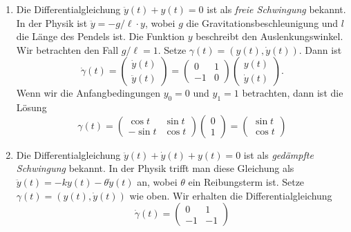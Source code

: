 \documentclass[../main.tex]{subfiles}
\begin{document}
\begin{examples}
  \leavevmode
  \begin{enumerate}[(1)]
    \item Die Differentialgleichung $\ddot y(t) + y(t) = 0$ 
      ist als
      \emph{freie Schwingung}
      bekannt. In der Physik ist $\ddot y = -g/\ell \cdot y$,
      wobei $g$ die Gravitationsbeschleunigung und $l$ 
      die Länge des Pendels ist.
      Die Funktion $y$ beschreibt den Auslenkungswinkel.
      Wir betrachten den Fall $g/\ell = 1$.
      Setze $\gamma(t) = (y(t), \dot y(t))$.
      Dann ist
      \[
        \dot \gamma(t) =
        \begin{pmatrix}
          \dot y(t) \\
          \ddot y(t)
        \end{pmatrix}
        =
        \begin{pmatrix}
          0 & 1 \\ -1 & 0
        \end{pmatrix}
        \begin{pmatrix}
          y(t) \\
          \dot y(t)
        \end{pmatrix}.
      \]
      Wenn wir die Anfangbedingungen $y_0 = 0$ 
      und $y_1 = 1$ betrachten, dann ist die Lösung
      \[
        \gamma(t) =
        \begin{pmatrix}
          \cos t & \sin t \\
          -\sin t & \cos t
        \end{pmatrix}
        \begin{pmatrix}
          0 \\ 1
        \end{pmatrix}
        =
        \begin{pmatrix}
          \sin t\\
          \cos t
        \end{pmatrix}
      \]
    \item Die Differentialgleichung
      $\ddot y(t) + \dot y(t) + y(t) = 0$ 
      ist als \emph{gedämpfte Schwingung} bekannt.
      In der Physik trifft man diese Gleichung
      als $\ddot y(t) = -ky(t) - \theta \dot y (t)$ an,
      wobei $\theta$ ein Reibungsterm ist.
      Setze $\gamma(t) = (y(t), \dot y(t))$ wie oben.
      Wir erhalten die Differentialgleichung
      \[
        \dot \gamma(t) =
        \begin{pmatrix}
          0 & 1 \\
          -1 & -1
        \end{pmatrix}
\]
\end{enumerate}
\end{examples}
\end{document}
